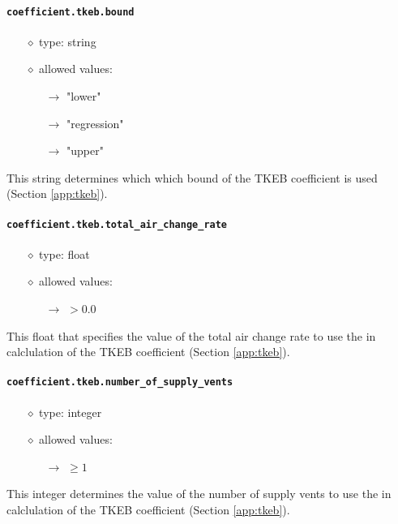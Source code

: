 \documentclass[]{article}
\def\code#1{\texttt{#1}}
\begin{document}
\paragraph{\code{coefficient.tkeb.bound}}
\begin{itemize}
    \item[$\diamond$] type: string 
    \item[$\diamond$] allowed values:
    \begin{itemize}
        \item[$\rightarrow$] "lower"
        \item[$\rightarrow$] "regression"
        \item[$\rightarrow$] "upper"
    \end{itemize}
\end{itemize}
This string determines which which bound of the TKEB coefficient is used
(Section \ref{app:tkeb}).

\paragraph{\code{coefficient.tkeb.total\_air\_change\_rate}}
\begin{itemize}
    \item[$\diamond$] type: float
    \item[$\diamond$] allowed values:
    \begin{itemize}
        \item[$\rightarrow$] $>0.0$
    \end{itemize}
\end{itemize}
This float that specifies the value of the total air change rate to use the in
calclulation of the TKEB coefficient (Section \ref{app:tkeb}).

\paragraph{\code{coefficient.tkeb.number\_of\_supply\_vents}}
\begin{itemize}
    \item[$\diamond$] type: integer 
    \item[$\diamond$] allowed values:
    \begin{itemize}
        \item[$\rightarrow$] $\geq 1$
    \end{itemize}
\end{itemize}
This integer determines the value of the number of supply vents to use the in
calclulation of the TKEB coefficient (Section \ref{app:tkeb}).
\end{document}
